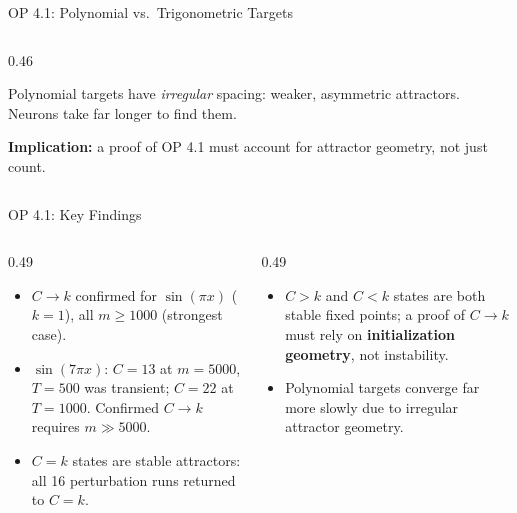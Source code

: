 \documentclass[aspectratio=169, 10pt]{beamer}
\begin{document}
\begin{frame}{OP 4.1: Polynomial vs.\ Trigonometric Targets}
\begin{columns}[T]
\begin{column}{0.46\textwidth}
\begin{tcolorbox}[slideboxA,
                        title={Why inflection geometry matters}]
        \vspace{4pt}
        Polynomial targets have \emph{irregular} spacing:
        weaker, asymmetric attractors.
        Neurons take far longer to find them.

        \vspace{4pt}
        \textbf{Implication:} a proof of OP 4.1 must
        account for attractor geometry, not just count.
      \end{tcolorbox}
    \end{column}
  \end{columns}
\end{frame}

\begin{frame}{OP 4.1: Key Findings}
  \begin{columns}[T]
    \begin{column}{0.49\textwidth}
      \begin{tcolorbox}[slideboxC, title={What was confirmed}]
        \small
        \begin{itemize}\setlength{\itemsep}{3pt}
          \item $C \to k$ confirmed for $\sin(\pi x)$ ($k=1$),
                all $m \geq 1000$ (strongest case).
          \item $\sin(7\pi x)$: $C=13$ at $m=5000$, $T=500$
                was transient; $C=22$ at $T=1000$.
                Confirmed $C \to k$ requires $m \gg 5000$.
          \item $C = k$ states are stable attractors:
                all 16 perturbation runs returned to $C = k$.
        \end{itemize}
      \end{tcolorbox}
    \end{column}
    \begin{column}{0.49\textwidth}
      \begin{tcolorbox}[slideboxB, title={What the data reveals about OP 4.1}]
        \small
        \begin{itemize}\setlength{\itemsep}{3pt}
          \item $C > k$ and $C < k$ states are both
                stable fixed points; a proof of $C \to k$
                must rely on \textbf{initialization geometry},
                not instability.
          \item Polynomial targets converge far more slowly
                due to irregular attractor geometry.
        \end{itemize}
      \end{tcolorbox}
    \end{column}
  \end{columns}
\end{frame}
\end{document}
